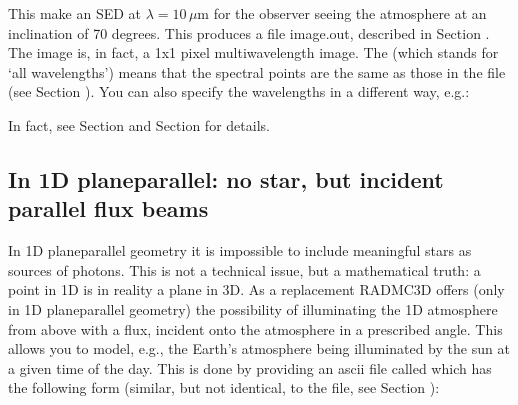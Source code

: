 \documentclass[letterpaper,10pt,english]{sphinxmanual}
\begin{document}
\begin{sphinxVerbatim}[commandchars=\\\{\}]
    
\end{sphinxVerbatim}

This make an SED at \(\lambda=10\,\mu\)m for the observer seeing the
atmosphere at an inclination of 70 degrees. This produces a file image.out,
described in Section {\hyperref[\detokenize{inputoutputfiles:sec-image-out}]{}}. The image is, in fact, a 1x1 pixel
multi\sphinxhyphen{}wavelength image. The  (which stands for ‘all wavelengths’) means
that the spectral points are the same as those in the 
file (see Section {\hyperref[\detokenize{inputoutputfiles:sec-wavelengths}]{}}).  You can also specify the wavelengths
in a different way, e.g.:

\begin{sphinxVerbatim}[commandchars=\\\{\}]
      
\end{sphinxVerbatim}

In fact, see Section {\hyperref[\detokenize{imagesspectra:sec-multi-wavelength-images}]{}} and
Section {\hyperref[\detokenize{imagesspectra:sec-set-camera-frequencies}]{}} for details.


\subsection{In 1\sphinxhyphen{}D plane\sphinxhyphen{}parallel: no star, but incident parallel flux beams}
\label{\detokenize{gridding:in-1-d-plane-parallel-no-star-but-incident-parallel-flux-beams}}
In 1\sphinxhyphen{}D plane\sphinxhyphen{}parallel geometry it is impossible to include meaningful stars as
sources of photons. This is not a technical issue, but a mathematical truth: a
point in 1\sphinxhyphen{}D is in reality a plane in 3\sphinxhyphen{}D. As a replacement RADMC\sphinxhyphen{}3D offers
(only in 1\sphinxhyphen{}D plane\sphinxhyphen{}parallel geometry) the possibility of illuminating the 1\sphinxhyphen{}D
atmosphere from above with a flux, incident onto the atmosphere in a prescribed
angle. This allows you to model, e.g., the Earth’s atmosphere being illuminated
by the sun at a given time of the day.  This is done by providing an ascii file
called  which has the following form (similar, but not identical,
to the  file, see Section {\hyperref[\detokenize{inputoutputfiles:sec-stars}]{}}):
\end{document}
